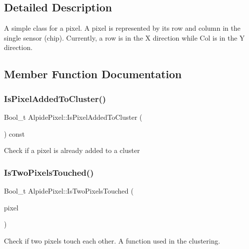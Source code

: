 \subsection{Detailed Description}
A simple class for a pixel. A pixel is represented by its row and column in the single sensor (chip). Currently, a row is in the X direction while Col is in the Y direction. 

\subsection{Member Function Documentation}
\mbox{\label{class_alpide_pixel_af532dfd2d03d8ad769b9f4ec12f5df1f}} 
\subsubsection{\texorpdfstring{Is\+Pixel\+Added\+To\+Cluster()}{IsPixelAddedToCluster()}}
{\footnotesize\ttfamily Bool\+\_\+t Alpide\+Pixel\+::\+Is\+Pixel\+Added\+To\+Cluster (\begin{DoxyParamCaption}{ }\end{DoxyParamCaption}) const\hspace{0.3cm}{\ttfamily [inline]}}

Check if a pixel is already added to a cluster \mbox{\label{class_alpide_pixel_a48184caa692d77f6c4ad70e25f18a69b}} 
\subsubsection{\texorpdfstring{Is\+Two\+Pixels\+Touched()}{IsTwoPixelsTouched()}}
{\footnotesize\ttfamily Bool\+\_\+t Alpide\+Pixel\+::\+Is\+Two\+Pixels\+Touched (\begin{DoxyParamCaption}\item[{\mbox{\hyperlink{class_alpide_pixel}{Alpide\+Pixel}} $\ast$}]{pixel }\end{DoxyParamCaption})}

Check if two pixels touch each other. A function used in the clustering. 

